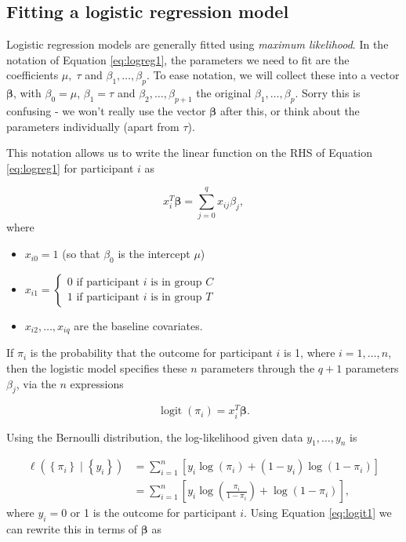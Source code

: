 \documentclass[
  openany]{book}
\providecommand{\tightlist}{%
  \setlength{\itemsep}{0pt}\setlength{\parskip}{0pt}}
\theoremstyle{definition}
\theoremstyle{definition}
\theoremstyle{definition}
\theoremstyle{definition}
\theoremstyle{remark}
\begin{document}
\hypertarget{fitting-a-logistic-regression-model}{%
\subsection{Fitting a logistic regression model}\label{fitting-a-logistic-regression-model}}

Logistic regression models are generally fitted using \emph{maximum likelihood}. In the notation of Equation \eqref{eq:logreg1}, the parameters we need to fit are the coefficients \(\mu,\;\tau\) and \(\beta_1,\ldots,\beta_p\). To ease notation, we will collect these into a vector \(\boldsymbol\beta\), with \(\beta_0=\mu\), \(\beta_1=\tau\) and \(\beta_2,\ldots,\beta_{p+1}\) the original \(\beta_1,\ldots,\beta_p\). Sorry this is confusing - we won't really use the vector \(\boldsymbol\beta\) after this, or think about the parameters individually (apart from \(\tau\)).

This notation allows us to write the linear function on the RHS of Equation \eqref{eq:logreg1} for participant \(i\) as

\[x_i^T\boldsymbol\beta = \sum\limits_{j=0}^{q} x_{ij}\beta_j, \]
where

\begin{itemize}
\tightlist
\item
  \(x_{i0}=1\) (so that \(\beta_0\) is the intercept \(\mu\))
\item
  \(x_{i1}=  \begin{cases}  0\text{ if participant }i\text{ is in group }C\\  1\text{ if participant }i\text{ is in group }T  \end{cases}\)
\item
  \(x_{i2},\ldots,x_{iq}\) are the baseline covariates.
\end{itemize}

If \(\pi_i\) is the probability that the outcome for participant \(i\) is 1, where \(i=1,\ldots,n\), then the logistic model specifies these \(n\) parameters through the \(q+1\) parameters \(\beta_j\), via the \(n\) expressions

\begin{equation}
\operatorname{logit}\left(\pi_i\right) = x_i^T\boldsymbol\beta.
\label{eq:logit1}
\end{equation}

Using the Bernoulli distribution, the log-likelihood given data \(y_1,\ldots,y_n\) is

\begin{align*}
\ell\left(\left\lbrace\pi_i \right\rbrace \mid\left\lbrace y_i\right\rbrace\right) & = \sum\limits_{i=1}^n\left[y_i\log(\pi_i) + \left(1-y_i\right)\log\left(1-\pi_i\right)\right]\\
& = \sum\limits_{i=1}^n\left[y_i\log\left(\frac{\pi_i}{1-\pi_i}\right) + \log\left(1-\pi_i\right)\right],
\end{align*}
where \(y_i=0\) or 1 is the outcome for participant \(i\). Using Equation \eqref{eq:logit1} we can rewrite this in terms of \(\boldsymbol\beta\) as
\end{document}

